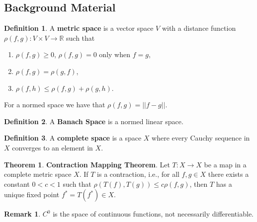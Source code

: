 \documentclass[12pt]{article}
\theoremstyle{definition}
\newtheorem*{definition}{Definition}
\newtheorem{theorem}{Theorem}[section]  %
\newtheorem*{remark}{Remark}
\begin{document}
\subsection{Background Material}

\begin{definition}
A \textbf{metric space} is a vector space $V$ with a distance function $\rho (f,g): V \times V \rightarrow \mathbb{R}$
such that
\begin{enumerate}
\item $\rho(f,g) \geq 0$, $\rho(f,g) = 0$ only when $f = g$,
\item $\rho(f, g) = \rho(g, f)$,
\item $\rho(f,h) \leq \rho(f,g) + \rho(g,h)$.
\end{enumerate}
\end{definition}

For a normed space we have that $\rho(f,g) = ||f-g||$.

\begin{definition}
A \textbf{Banach Space} is a normed linear space.
\end{definition}

\begin{definition}
A \textbf{complete space} is a space $X$ where every Cauchy sequence in $X$ converges to an element in $X$. 
\end{definition}

\begin{theorem} \textbf{Contraction Mapping Theorem}.
Let $T: X \rightarrow X$ be a map in a complete metric space $X$. If $T$ is a contraction, i.e., for all $f,g \in X$ there exists
a constant $0 < c < 1$ such that $\rho(T(f), T(g)) \leq c \rho(f,g)$, then $T$ has a unique fixed point $f^{*} = T(f^{*}) \in X$.
\end{theorem}

\begin{remark}
$C^{0}$ is the space of continuous functions, not necessarily differentiable.
\end{remark}
\end{document}
